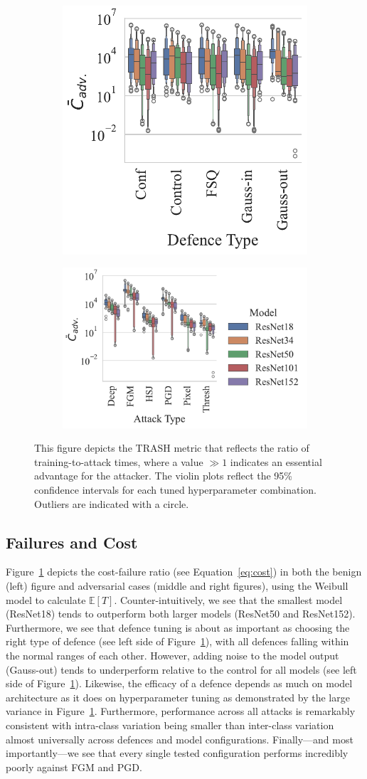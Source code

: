 \begin{figure}
    \centering
    \begin{subfigure}
        \centering
        \includegraphics[width=.28\textwidth]{plots/trash_score_vs_defence_type.pdf}
    \end{subfigure}
    \begin{subfigure}
        \centering
        \includegraphics[width=.45\textwidth]{plots/trash_score_vs_attack_type.pdf}
    \end{subfigure}

    \caption{This figure depicts the TRASH metric that reflects the ratio of training-to-attack times, where a value $\gg 1 $  indicates an essential advantage for the attacker. The violin plots reflect the 95\% confidence intervals for each tuned hyperparameter combination. Outliers are indicated with a circle.}
	\label{fig:trash}
\end{figure}

\subsection{Failures and Cost}

Figure~\ref{fig:trash} depicts the cost-failure ratio (see Equation~\ref{eq:cost}) in both the benign (left) figure and adversarial cases (middle and right figures), using the Weibull model to calculate $\mathbb{E}[T]$. Counter-intuitively, we see that the smallest model (ResNet18) tends to outperform both larger models (ResNet50 and ResNet152). 
Furthermore, we see that defence tuning is about as important as choosing the right type of defence (see left side of Figure~\ref{fig:trash}), with all defences falling within the normal ranges of each other. 
However, adding noise to the model output (Gauss-out) tends to underperform relative to the control for all models (see left side of Figure~\ref{fig:trash}). 
Likewise, the efficacy of a defence depends as much on model architecture as it does on hyperparameter tuning as demonstrated by the large variance in Figure~\ref{fig:trash}. 
Furthermore, performance across all attacks is remarkably consistent with intra-class variation being smaller than inter-class variation almost universally across defences and model configurations. 
Finally---and most importantly---we see that every single tested configuration performs incredibly poorly against FGM and PGD\@.
